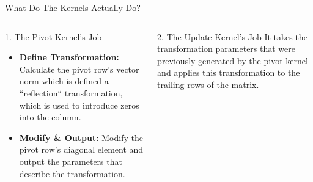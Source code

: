 \begin{frame}{What Do The Kernels Actually Do?}
  \begin{columns}[T,onlytextwidth]

    \begin{block}{1. The Pivot Kernel's Job}
\begin{itemize}
    \item \textbf{Define Transformation:} Calculate the pivot row's vector norm which is  defined a ``reflection`` transformation, which is used to introduce zeros into the column.
    \item \textbf{Modify \& Output:} Modify the pivot row's diagonal element and output the parameters that describe the transformation.
\end{itemize}
    \end{block}
    
    \centering
    
    \begin{block}{2. The Update Kernel's Job}
    It takes the transformation parameters that were previously generated by the pivot kernel and applies this transformation to the trailing rows of the matrix.
    \end{block}


\end{columns}
\end{frame}
